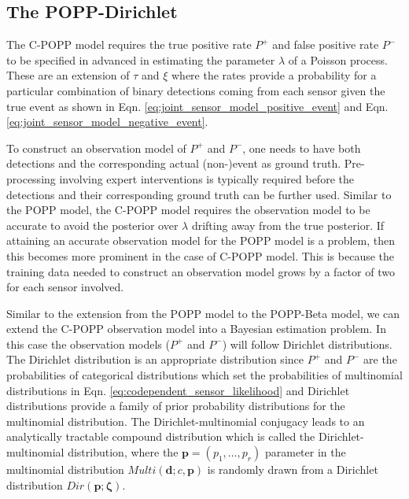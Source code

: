 
\subsection{The POPP-Dirichlet}
\label{subsec:popd}

The C-POPP model requires the true positive rate $P^+$ and false positive rate $P^-$ to be specified in advanced in estimating the parameter $\lambda$ of a Poisson process. These are an extension of $\tau$ and $\xi$ where the rates provide a probability for a particular combination of binary detections coming from each sensor given the true event as shown in Eqn. \ref{eq:joint_sensor_model_positive_event} and Eqn. \ref{eq:joint_sensor_model_negative_event}.

To construct an observation model of $P^+$ and $P^-$, one needs to have both detections and the corresponding actual (non-)event as ground truth. Pre-processing involving expert interventions is typically required before the detections and their corresponding ground truth can be further used. Similar to the POPP model, the C-POPP model requires the observation model to be accurate to avoid the posterior over $\lambda$ drifting away from the true posterior. If attaining an accurate observation model for the POPP model is a problem, then this becomes more prominent in the case of C-POPP model. This is because the training data needed to construct an observation model grows by a factor of two for each sensor involved.       

Similar to the extension from the POPP model to the POPP-Beta model, we can extend the C-POPP observation model into a Bayesian estimation problem. In this case the observation models ($P^+$ and $P^-$) will follow Dirichlet distributions. The Dirichlet distribution is an appropriate distribution since $P^+$ and $P^-$ are the probabilities of categorical distributions which set the probabilities of multinomial distributions in Eqn. \ref{eq:codependent_sensor_likelihood} and Dirichlet distributions provide a family of prior probability distributions for the multinomial distribution. The Dirichlet-multinomial conjugacy leads to an analytically tractable compound distribution which is called the Dirichlet-multinomial distribution, where the $\mathbf{p} = (p_1, \ldots, p_r)$ parameter in the multinomial distribution $Multi(\mathbf{d} ; c, \mathbf{p})$ is randomly drawn from a Dirichlet distribution $Dir(\mathbf{p} ; \mathbf{\zeta})$. 

